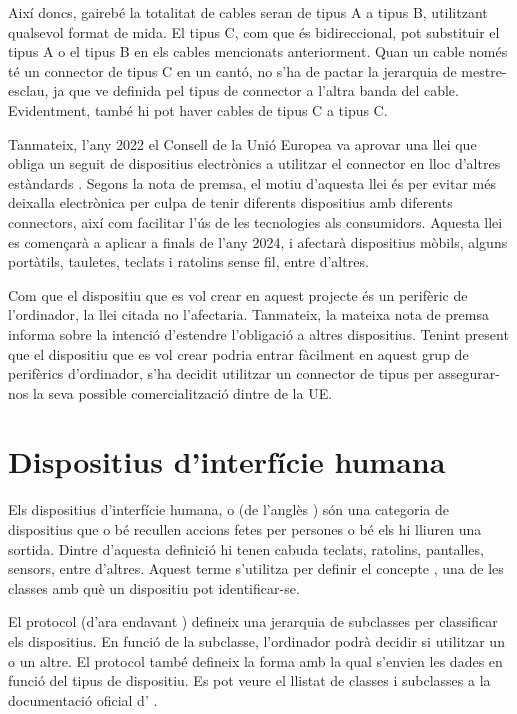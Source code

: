 Així doncs, gairebé la totalitat de cables  seran de tipus A a tipus
B, utilitzant qualsevol format de mida. El tipus C, com que és bidireccional, pot
substituir el tipus A o el tipus B en els cables mencionats anteriorment.
Quan un cable només té un connector de tipus C en un cantó, no s'ha de pactar
la jerarquia de mestre-esclau, ja que ve definida pel tipus de connector a
l'altra banda del cable. Evidentment, també hi pot haver cables de tipus C a
tipus C.

Tanmateix, l'any 2022 el Consell de la Unió Europea va aprovar una llei
que obliga un seguit de dispositius electrònics a utilitzar el connector
 en lloc d'altres estàndards \cite{Council2022Common}. Segons la
nota de premsa, el motiu d'aquesta llei és per evitar més deixalla electrònica
per culpa de tenir diferents dispositius amb diferents connectors, així com
facilitar l'ús de les tecnologies als consumidors. Aquesta llei
es començarà a aplicar a finals de l'any 2024, i afectarà dispositius mòbils, 
alguns portàtils, tauletes, teclats i ratolins sense fil, entre
d'altres.

Com que el dispositiu que es vol crear en aquest projecte és un perifèric de
l'ordinador, la llei citada no l'afectaria. Tanmateix, la mateixa nota de premsa
informa sobre la intenció d'estendre l'obligació a altres dispositius.
Tenint present que el dispositiu que es vol crear podria entrar fàcilment en
aquest grup de perifèrics d'ordinador, s'ha decidit utilitzar un connector de
tipus  per assegurar-nos la seva possible comercialització dintre
de la UE.

\section{Dispositius d'interfície humana}
\label{sec:hut}

Els dispositius d'interfície humana, o  (de l'anglès
) són una categoria de dispositius que o bé recullen
accions fetes per persones o bé els hi lliuren una sortida. Dintre d'aquesta
definició hi tenen cabuda teclats, ratolins, pantalles, sensors, entre d'altres.
Aquest terme s'utilitza per definir el concepte , una de les
classes  amb què un dispositiu pot identificar-se.

El protocol  (d'ara endavant ) defineix una jerarquia
de subclasses per classificar els dispositius. En funció de la subclasse,
l'ordinador podrà decidir si utilitzar un  o un altre. El protocol
també defineix la forma amb la qual s'envien les dades en funció del tipus de
dispositiu. Es pot veure el llistat de classes i subclasses  a la
documentació oficial d' \cite{HidDefinition}.

